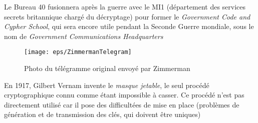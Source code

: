 Le Bureau 40 fusionnera après la guerre avec le MI1 (département des
services secrets britannique chargé du décryptage) pour former le
\emph{Government Code and Cypher School}, qui sera encore utile
pendant la Seconde Guerre mondiale, sous le nom de \emph{Government
  Communications Headquarters} \\

\begin{figure}[h]
  \begin{center}
    \texttt{[image: eps/ZimmermanTelegram]}
  \end{center}
  \caption{Photo du télégramme original envoyé par Zimmerman}
  \label{fig:JeffersonDisk}
\end{figure}

En 1917, Gilbert Vernam invente le \emph{masque jetable}, le
seul procédé cryptographique connu comme étant impossible à casser. Ce
procédé n'est pas directement utilisé car il pose des difficultées de
mise en place (problèmes de génération et de transmission des clés,
qui doivent être uniques) %


